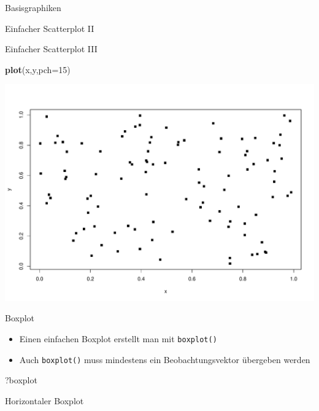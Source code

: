 \documentclass[ignorenonframetext,]{beamer}
\newenvironment{Shaded}{}{}
\newcommand{\KeywordTok}[1]{\textcolor[rgb]{0.00,0.44,0.13}{\textbf{{#1}}}}
\newcommand{\DataTypeTok}[1]{\textcolor[rgb]{0.56,0.13,0.00}{{#1}}}
\newcommand{\DecValTok}[1]{\textcolor[rgb]{0.25,0.63,0.44}{{#1}}}
\newcommand{\NormalTok}[1]{{#1}}
\providecommand{\tightlist}{%
\setlength{\itemsep}{0pt}\setlength{\parskip}{0pt}}
\begin{document}
\begin{frame}[fragile]{Basisgraphiken}
\begin{block}{Einfacher Scatterplot II}
\end{block}

\begin{block}{Einfacher Scatterplot III}

\begin{Shaded}
\begin{Highlighting}[]
\KeywordTok{plot}\NormalTok{(x,y,}\DataTypeTok{pch=}\DecValTok{15}\NormalTok{)}
\end{Highlighting}
\end{Shaded}

\includegraphics{R_intern_files/figure-beamer/unnamed-chunk-163-1.pdf}

\end{block}

\begin{block}{Boxplot}

\begin{itemize}
\tightlist
\item
  Einen einfachen Boxplot erstellt man mit \texttt{boxplot()}
\item
  Auch \texttt{boxplot()} muss mindestens ein Beobachtungsvektor
  übergeben werden
\end{itemize}

\begin{Shaded}
\begin{Highlighting}[]
\NormalTok{?boxplot}
\end{Highlighting}
\end{Shaded}

\end{block}

\begin{block}{Horizontaler Boxplot}


\end{block}
\end{frame}
\end{document}
